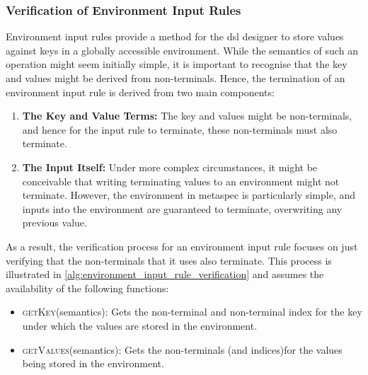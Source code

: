 \subsubsection{Verification of Environment Input Rules} %
\label{ssub:verification_of_environment_input_rules}
Environment input rules provide a method for the \gls{dsl} designer to store values against keys in a globally accessible environment. 
While the semantics of such an operation might seem initially simple, it is important to recognise that the key and values might be derived from non-terminals.
Hence, the termination of an environment input rule is derived from two main components:
\begin{enumerate}
    \item \textbf{The Key and Value Terms:} The key and values might be non-terminals, and hence for the input rule to terminate, these non-terminals must also terminate.
    \item \textbf{The Input Itself:} Under more complex circumstances, it might be conceivable that writing terminating values to an environment might not terminate.
    However, the environment in \gls{metaspec} is particularly simple, and inputs into the environment are guaranteed to terminate, overwriting any previous value.
\end{enumerate}

As a result, the verification process for an environment input rule focuses on just verifying that the non-terminals that it uses also terminate.
This process is illustrated in \autoref{alg:environment_input_rule_verification} and assumes the availability of the following functions:
\begin{itemize}
    \item \textsc{getKey}(semantics): Gets the non-terminal and non-terminal index for the key under which the values are stored in the environment.
    \item \textsc{getValues}(semantics): Gets the non-terminals (and indices)for the values being stored in the environment.
\end{itemize}

